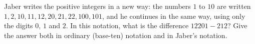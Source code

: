 Jaber writes the positive integers in a new way: the numbers $1$ to $10$ are written $1,2,10,11,12,20,21,22,100,101$, and he continues in the same way, using only the digits $0$, $1$ and $2$. In this notation, what is the difference $12201-212$? Give the answer both in ordinary (base-ten) notation and in Jaber's notation.

